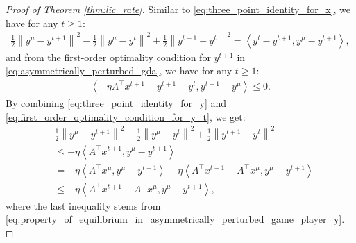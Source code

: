 \documentclass{article}
\theoremstyle{plain}
\begin{document}
\begin{proof}[Proof of Theorem \ref{thm:lic_rate}]
    Similar to \eqref{eq:three_point_identity_for_x}, we have for any $t\geq 1$:
    \begin{align}
        \frac{1}{2}\left\|y^{\mu} - y^{t+1}\right\|^2 - \frac{1}{2}\left\|y^{\mu} - y^t\right\|^2 + \frac{1}{2}\left\|y^{t+1} - y^t\right\|^2 = \left\langle y^t - y^{t+1}, y^{\mu} - y^{t+1}\right\rangle,
        \label{eq:three_point_identity_for_y}
    \end{align}
    and from the first-order optimality condition for $y^{t+1}$ in \eqref{eq:asymmetrically_perturbed_gda}, we have for any $t\geq 1$:
    \begin{align}
        \left\langle -\eta A^{\top}x^{t+1} + y^{t+1} - y^t, y^{t+1} - y^{\mu}\right\rangle \leq 0.
        \label{eq:first_order_optimality_condition_for_y_t}
    \end{align}
    By combining \eqref{eq:three_point_identity_for_y} and \eqref{eq:first_order_optimality_condition_for_y_t}, we get:
    \begin{align}
        & \frac{1}{2}\left\|y^{\mu} - y^{t+1}\right\|^2 - \frac{1}{2}\left\|y^{\mu} - y^t\right\|^2 + \frac{1}{2}\left\|y^{t+1} - y^t\right\|^2 \nonumber                      \\
        & \leq -\eta \left\langle A^{\top}x^{t+1}, y^{\mu} - y^{t+1}\right\rangle \nonumber                                                                                    \\
        & = -\eta \left\langle A^{\top}x^{\mu}, y^{\mu} - y^{t+1}\right\rangle - \eta \left\langle A^{\top}x^{t+1} - A^{\top}x^{\mu}, y^{\mu} - y^{t+1}\right\rangle \nonumber \\
        & \leq -\eta \left\langle A^{\top}x^{t+1} - A^{\top}x^{\mu}, y^{\mu} - y^{t+1}\right\rangle,
        \label{eq:three_point_inequality_for_y}
    \end{align}
    where the last inequality stems from \eqref{eq:property_of_equilibrium_in_asymmetrically_perturbed_game_player_y}.


\end{proof}
\end{document}
